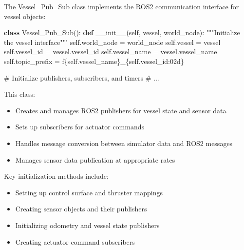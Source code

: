 \documentclass[
  letterpaper,
  DIV=11,
  numbers=noendperiod]{scrreprt}
\newenvironment{Shaded}{\begin{snugshade}}{\end{snugshade}}
\newcommand{\CommentTok}[1]{\textcolor[rgb]{0.37,0.37,0.37}{#1}}
\newcommand{\FunctionTok}[1]{\textcolor[rgb]{0.28,0.35,0.67}{#1}}
\newcommand{\KeywordTok}[1]{\textcolor[rgb]{0.00,0.23,0.31}{\textbf{#1}}}
\newcommand{\NormalTok}[1]{\textcolor[rgb]{0.00,0.23,0.31}{#1}}
\newcommand{\OperatorTok}[1]{\textcolor[rgb]{0.37,0.37,0.37}{#1}}
\newcommand{\SpecialCharTok}[1]{\textcolor[rgb]{0.37,0.37,0.37}{#1}}
\newcommand{\SpecialStringTok}[1]{\textcolor[rgb]{0.13,0.47,0.30}{#1}}
\newcommand{\VariableTok}[1]{\textcolor[rgb]{0.07,0.07,0.07}{#1}}
\providecommand{\tightlist}{%
  \setlength{\itemsep}{0pt}\setlength{\parskip}{0pt}}\usepackage{longtable,booktabs,array}
\begin{document}
The Vessel\_Pub\_Sub class implements the ROS2 communication interface
for vessel objects:

\begin{Shaded}
\begin{Highlighting}[]
\KeywordTok{class}\NormalTok{ Vessel\_Pub\_Sub():}
    \KeywordTok{def} \FunctionTok{\_\_init\_\_}\NormalTok{(}\VariableTok{self}\NormalTok{, vessel, world\_node):}
        \CommentTok{"""Initialize the vessel interface"""}
        \VariableTok{self}\NormalTok{.world\_node }\OperatorTok{=}\NormalTok{ world\_node}
        \VariableTok{self}\NormalTok{.vessel }\OperatorTok{=}\NormalTok{ vessel}
        \VariableTok{self}\NormalTok{.vessel\_id }\OperatorTok{=}\NormalTok{ vessel.vessel\_id}
        \VariableTok{self}\NormalTok{.vessel\_name }\OperatorTok{=}\NormalTok{ vessel.vessel\_name}
        \VariableTok{self}\NormalTok{.topic\_prefix }\OperatorTok{=} \SpecialStringTok{f\textquotesingle{}}\SpecialCharTok{\{}\VariableTok{self}\SpecialCharTok{.}\NormalTok{vessel\_name}\SpecialCharTok{\}}\SpecialStringTok{\_}\SpecialCharTok{\{}\VariableTok{self}\SpecialCharTok{.}\NormalTok{vessel\_id}\SpecialCharTok{:02d\}}\SpecialStringTok{\textquotesingle{}}
        
        \CommentTok{\# Initialize publishers, subscribers, and timers}
        \CommentTok{\# ...}
\end{Highlighting}
\end{Shaded}

This class:

\begin{itemize}
\tightlist
\item
  Creates and manages ROS2 publishers for vessel state and sensor data
\item
  Sets up subscribers for actuator commands
\item
  Handles message conversion between simulator data and ROS2 messages
\item
  Manages sensor data publication at appropriate rates
\end{itemize}

Key initialization methods include:

\begin{itemize}
\tightlist
\item
  Setting up control surface and thruster mappings
\item
  Creating sensor objects and their publishers
\item
  Initializing odometry and vessel state publishers
\item
  Creating actuator command subscribers
\end{itemize}
\end{document}

